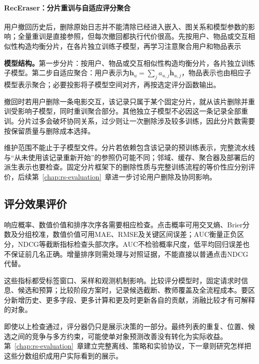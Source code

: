 \paragraph{RecEraser：分片重训与自适应评分聚合}
\label{sec:rs-receraser}

用户撤回历史后，删除原始日志并不能清除已经进入嵌入、图关系和模型参数的影响；全量重训是直接参照，但每次撤回都执行代价很高。先按用户、物品或交互相似性构造均衡分片，在各片独立训练子模型，再学习注意聚合用户和物品表示

\textbf{模型结构。}第一步分片：按用户、物品或交互相似性构造均衡分片，各片独立训练子模型。第二步自适应聚合：用户表示为$\bm h_u=\sum_j a_{u,j}\widetilde{\bm h}_{u,j}$，物品表示也由相应子模型表示聚合；必要投影将子模型空间对齐，再按选定评分函数输出。

撤回时若用户删除一条电影交互，该记录只属于某个固定分片，就从该片删除并重训受影响子模型，同时重训聚合部分。其他独立子模型不必因这一条记录全部重训。分片过多会破坏协同关系，过少则让一次删除涉及较多训练，因此分片数需要按保留质量与删除成本选择。

维护范围不能止于子模型文件。分片若依赖包含该记录的预训练表示，完整流水线与“从未使用该记录重新开始”的参照仍可能不同；邻域、缓存、聚合器及部署后的派生表示也要检查。固定分片框架下的删除性质与完整训练流程的等价性应分别评价，后续第~\ref{chap:rs-evaluation}~章进一步讨论用户删除及协同影响。

\subsection{评分效果评价}
\label{sec:rs-scoring-evaluation}

响应概率、数值价值和排序次序各需要相应检查。点击概率可用交叉熵、Brier分数及分组校准，数值价值可用MAE、RMSE及关键区间误差；AUC衡量正负区分，NDCG等截断指标检查头部次序。AUC不检验概率尺度，低平均回归误差也不保证前几名正确。增量排序则需处理与对照证据，不能直接以普通点击NDCG代替。

这些指标都受标签窗口、采样和观测机制影响。比较评分模型时，固定请求时信息、候选和预算；比较阶段方案时，记录候选截断、教师覆盖及全流程成本。要区分新增历史、更多字段、更多计算和更及时更新各自的贡献，消融比较才有可解释的对象。

即使以上检查通过，评分器仍只是展示决策的一部分。最终列表的重复、位置、候选之间的竞争与多方约束，可能使单对象预测改善没有转化为实际收益。第~\ref{chap:rs-evaluation}~章建立完整离线、策略和实验协议，下一章则研究怎样把这些分数组织成用户实际看到的展示。


